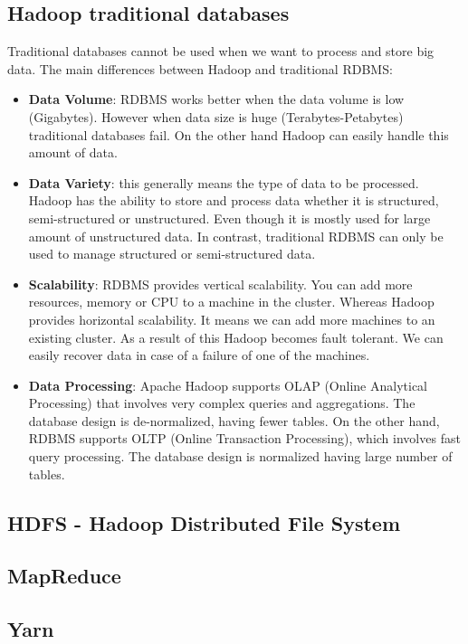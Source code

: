 \subsection{Hadoop \vs traditional databases}
Traditional databases cannot be used when we want to process and store big data. The main differences between Hadoop and traditional RDBMS:
\begin{itemize}
	\item \textbf{Data Volume}: RDBMS works better when the data volume is low (Gigabytes). However when data size is huge (Terabytes-Petabytes) traditional databases fail. On the other hand Hadoop can easily handle this amount of data.
	\item \textbf{Data Variety}: this generally means the type of data to be processed. Hadoop has the ability to store and process data whether it is structured, semi-structured or unstructured. Even though  it is mostly used for large amount of unstructured data. 
	In contrast, traditional RDBMS can only be used to manage structured or semi-structured data. 
	\item \textbf{Scalability}: RDBMS provides vertical scalability. You can add more resources, memory or CPU to a machine in the cluster. Whereas Hadoop provides horizontal scalability. It means we can add more machines to an existing cluster. As a result of this Hadoop becomes fault tolerant. We can easily recover data in case of a failure of one of the machines.
	\item \textbf{Data Processing}: Apache Hadoop supports OLAP (Online Analytical Processing) that involves very complex queries and aggregations. The database design is de-normalized, having fewer tables. On the other hand, RDBMS supports OLTP (Online Transaction Processing), which involves fast query processing. The database design is normalized having large number of tables. \cite{Hadoop-vs-RDBMS}
\end{itemize}
\subsection{HDFS - Hadoop Distributed File System}

\subsection{MapReduce}
\subsection{Yarn}